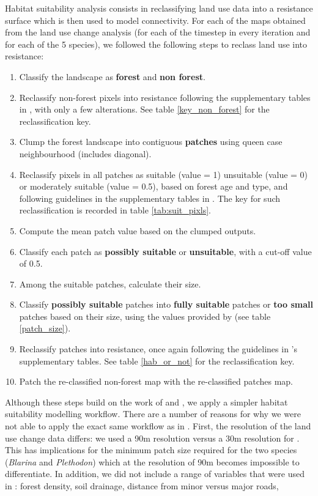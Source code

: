 Habitat suitability analysis consists in reclassifying land use data into a resistance surface which is then used to model connectivity. For each of the maps obtained from the land use change analysis (for each of the timestep in every iteration and for each of the 5 species), we followed the following steps to reclass land use into resistance:
\begin{enumerate}
\item Classify the landscape as \textbf{forest} and \textbf{non forest}.
\item Reclassify non-forest pixels into resistance following the supplementary tables in  \citeauthor{rayfield_priorisation_2018}, with only a few alterations. See table \ref{key_non_forest} for the reclassification key.
\item Clump the forest landscape into contiguous \textbf{patches} using queen case neighbourhood (includes diagonal).
\item Reclassify pixels in all patches as suitable (value = 1) unsuitable (value = 0) or moderately suitable (value = 0.5), based on forest age and type, and following guidelines in the supplementary tables in  \citeauthor{rayfield_priorisation_2018}.  The key for such reclassification is recorded in table \ref{tab:suit_pixls}.
\item  Compute the mean patch value based on the clumped outputs.
\item Classify each patch as \textbf{possibly suitable} or \textbf{unsuitable}, with a cut-off value of 0.5.
\item Among the suitable patches, calculate their size.
\item Classify \textbf{possibly suitable} patches into \textbf{fully suitable} patches or \textbf{too small} patches based on their size, using the values provided by \citeauthor{rayfield_priorisation_2018} (see table \ref{patch_size}).
\item Reclassify patches into resistance, once again following the guidelines in \citeauthor{rayfield_priorisation_2018}'s supplementary tables. See table \ref{hab_or_not} for the reclassification key.
\item Patch the re-classified non-forest map with the re-classified patches map.  
\end{enumerate}

Although these steps build on the work of \cite{albert_applying_2017} and \cite{rayfield_priorisation_2018}, we apply a simpler habitat suitability modelling workflow. There are a number of reasons for why we were not able to apply the exact same workflow as  in \citeauthor{rayfield_priorisation_2018}. First, the resolution of the land use change data differs: we used a 90m resolution versus a 30m resolution for \citeauthor{rayfield_priorisation_2018}. This has implications for the minimum patch size required for the two species (\textit{Blarina} and \textit{Plethodon}) which at the resolution of 90m becomes impossible to differentiate. In addition, we did not include a range of variables that were used in \citeauthor{rayfield_priorisation_2018}: forest density, soil drainage, distance from minor versus major roads,   \\

